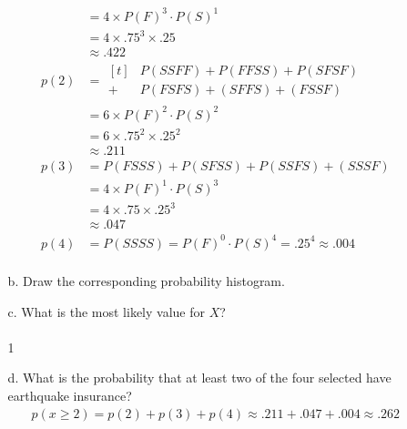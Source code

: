 \documentclass[letterpaper,12pt]{article}
\begin{document}
\begin{enumerate}
\begin{enumerate}
\begin{align*}
               &= 4 \times P(F)^3 \cdot P(S)^1 \\
               &= 4 \times .75^3 \times .25 \\
               &\approx .422 \\
          p(2) &= \begin{aligned}[t]
                 &P(SSFF) + P(FFSS) + P(SFSF) \\
                 + &P(FSFS) + (SFFS) + (FSSF)
               \end{aligned} \\
               &= 6 \times P(F)^2 \cdot P(S)^2 \\
               &= 6 \times .75^2 \times .25^2 \\
               &\approx .211 \\
          p(3) &= P(FSSS) + P(SFSS) + P(SSFS) + (SSSF) \\
               &= 4 \times P(F)^1 \cdot P(S)^3 \\
               &= 4 \times .75 \times .25^3 \\
               &\approx .047 \\
          p(4) &= P(SSSS) = P(F)^0 \cdot P(S)^4 = .25^4 \approx .004 \\
        \end{align*}
      \item[b.]
        Draw the corresponding probability histogram.
        \begin{center}
        \end{center}
      \item[c.]
        What is the most likely value for $X$?
        \\ \\
        1
      \item[d.]
        What is the probability that at least two of the four selected have earthquake insurance?
        \begin{align*}
          p(x \ge 2) = p(2) + p(3) + p(4) \approx .211 + .047 + .004 \approx .262

\end{align*}
\end{enumerate}
\end{enumerate}
\end{document}
